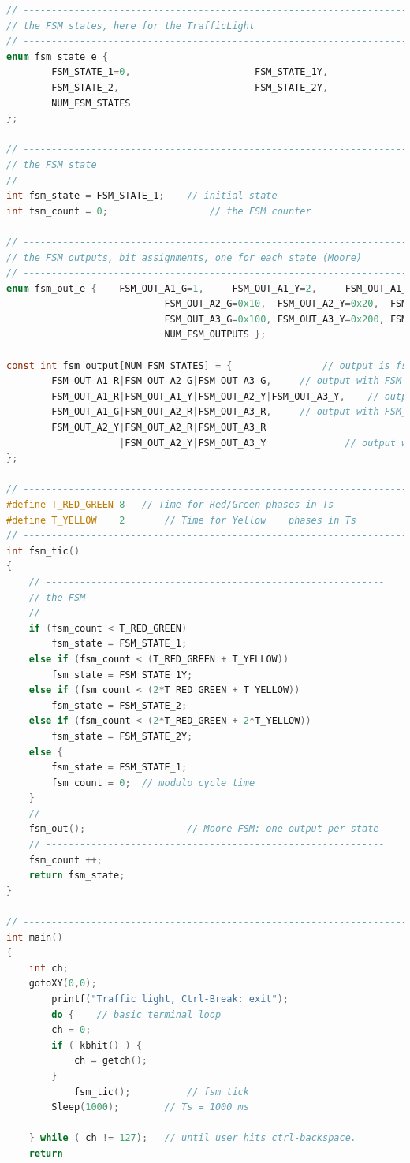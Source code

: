 \begin{lstlisting}[style=mystyle, language=c]
// ----------------------------------------------------------------------------
// the FSM states, here for the TrafficLight
// ----------------------------------------------------------------------------
enum fsm_state_e {
		FSM_STATE_1=0, 						FSM_STATE_1Y,
		FSM_STATE_2, 						FSM_STATE_2Y,
		NUM_FSM_STATES
};

// ----------------------------------------------------------------------------
// the FSM state
// ----------------------------------------------------------------------------
int fsm_state = FSM_STATE_1;	// initial state
int fsm_count = 0;					// the FSM counter

// ----------------------------------------------------------------------------
// the FSM outputs, bit assignments, one for each state (Moore)
// ----------------------------------------------------------------------------
enum fsm_out_e {	FSM_OUT_A1_G=1, 	FSM_OUT_A1_Y=2, 	FSM_OUT_A1_R=4,
							FSM_OUT_A2_G=0x10, 	FSM_OUT_A2_Y=0x20, 	FSM_OUT_A2_R=0x40,
							FSM_OUT_A3_G=0x100, FSM_OUT_A3_Y=0x200, FSM_OUT_A3_R=0x400,
							NUM_FSM_OUTPUTS };

const int fsm_output[NUM_FSM_STATES] = {				// output is fsm_output[fsm_state]
		FSM_OUT_A1_R|FSM_OUT_A2_G|FSM_OUT_A3_G,		// output with FSM_STATE_1
		FSM_OUT_A1_R|FSM_OUT_A1_Y|FSM_OUT_A2_Y|FSM_OUT_A3_Y,	// output with FSM_STATE_1Y
		FSM_OUT_A1_G|FSM_OUT_A2_R|FSM_OUT_A3_R,		// output with FSM_STATE_2
		FSM_OUT_A2_Y|FSM_OUT_A2_R|FSM_OUT_A3_R
					|FSM_OUT_A2_Y|FSM_OUT_A3_Y				// output with FSM_STATE_2Y
};

// ----------------------------------------------------------------------------
#define T_RED_GREEN	8	// Time for Red/Green phases in Ts
#define T_YELLOW	2		// Time for Yellow    phases in Ts
// ----------------------------------------------------------------------------
int fsm_tic()
{
	// ------------------------------------------------------------
	// the FSM 
	// ------------------------------------------------------------
	if (fsm_count < T_RED_GREEN)
		fsm_state = FSM_STATE_1;
	else if (fsm_count < (T_RED_GREEN + T_YELLOW))
		fsm_state = FSM_STATE_1Y;
	else if (fsm_count < (2*T_RED_GREEN + T_YELLOW))
		fsm_state = FSM_STATE_2;
	else if (fsm_count < (2*T_RED_GREEN + 2*T_YELLOW))
		fsm_state = FSM_STATE_2Y;
	else {
		fsm_state = FSM_STATE_1;
		fsm_count = 0;	// modulo cycle time
	}
	// ------------------------------------------------------------
	fsm_out();					// Moore FSM: one output per state
	// ------------------------------------------------------------
	fsm_count ++;
	return fsm_state;
}

// ----------------------------------------------------------------------------
int main()
{
	int ch;
	gotoXY(0,0);
  		printf("Traffic light, Ctrl-Break: exit");
    	do {	// basic terminal loop
        ch = 0;
        if ( kbhit() ) {
            ch = getch();
        }
			fsm_tic();			// fsm tick
        Sleep(1000);		// Ts = 1000 ms

    } while ( ch != 127);	// until user hits ctrl-backspace.
	return 

\end{lstlisting}


